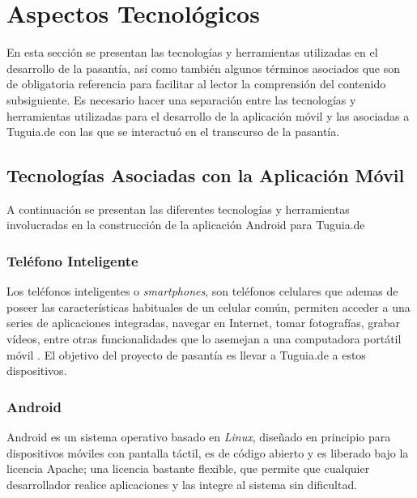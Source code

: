 \section{Aspectos Tecnológicos} \label{sect:aspectos_tecnologicos}

En esta sección se presentan las tecnologías y herramientas utilizadas en el desarrollo de la pasantía, así como también algunos términos asociados que son de obligatoria referencia para facilitar al lector la comprensión del contenido subsiguiente. Es necesario hacer una separación entre las tecnologías y herramientas utilizadas para el desarrollo de la aplicación móvil y las asociadas a Tuguia.de con las que se interactuó en el transcurso de la pasantía.

\subsection{Tecnologías Asociadas con la Aplicación Móvil} \label{subsect:Asociadas_movil}

A continuación se presentan las diferentes tecnologías y herramientas involucradas en la construcción de la aplicación Android para Tuguia.de 

\subsubsection{Teléfono Inteligente}

Los teléfonos inteligentes o \textit{smartphones}, son teléfonos celulares que ademas de poseer las características habituales de un celular común, permiten acceder a una series de aplicaciones integradas, navegar en Internet, tomar fotografías, grabar vídeos, entre otras funcionalidades que lo asemejan  a una computadora portátil móvil \cite{PCM}. El objetivo del proyecto de pasantía es llevar a Tuguia.de a estos dispositivos.

\subsubsection{Android}

Android es un sistema operativo basado en \textit{Linux}, diseñado en principio para dispositivos móviles con pantalla táctil, es de código abierto y es liberado bajo la licencia Apache; una licencia bastante flexible, que permite que cualquier desarrollador realice aplicaciones y las integre al sistema sin dificultad.

